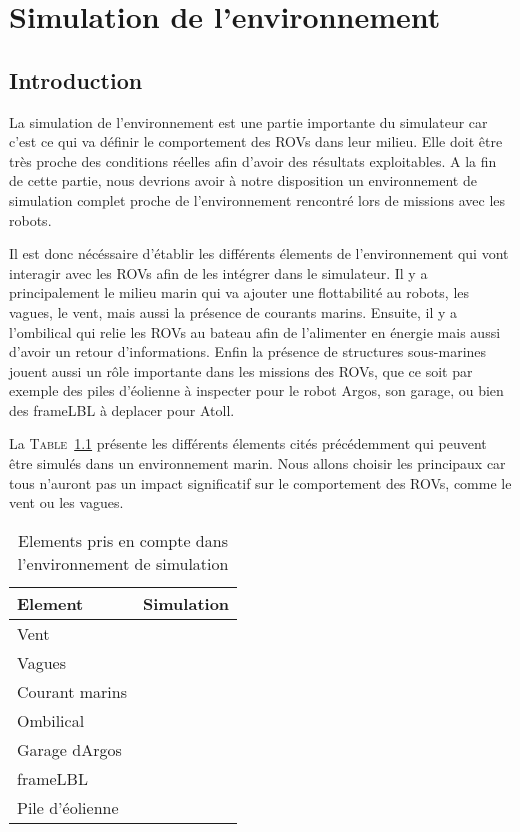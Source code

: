 \chapter{Simulation de l'environnement}
	\label{chapitre:environnement}
	
	\section{Introduction}

		La simulation de l'environnement est une partie importante du simulateur car c'est ce qui va définir le comportement des \gls{ROV}s dans leur milieu. Elle doit être très proche des conditions réelles afin d'avoir des résultats exploitables. A la fin de cette partie, nous devrions avoir à notre disposition un environnement de simulation complet proche de l'environnement rencontré lors de missions avec les robots.

		Il est donc nécéssaire d'établir les différents élements de l'environnement qui vont interagir avec les \gls{ROV}s afin de les intégrer dans le simulateur. Il y a principalement le milieu marin qui va ajouter une flottabilité au robots, les vagues, le vent, mais aussi la présence de courants marins. Ensuite, il y a l'ombilical qui relie les \gls{ROV}s au bateau afin de l'alimenter en énergie mais aussi d'avoir un retour d'informations. Enfin la présence de structures sous-marines jouent aussi un rôle importante dans les missions des \gls{ROV}s, que ce soit par exemple des piles d'éolienne à inspecter pour le robot \gls{Argos}, son garage, ou bien des \gls{frameLBL} à deplacer pour \gls{Atoll}.

		La \textsc{Table}~\ref{table:elements} présente les différents élements cités précédemment qui peuvent être simulés dans un environnement marin. Nous allons choisir les principaux car tous n'auront pas un impact significatif sur le comportement des \gls{ROV}s, comme le vent ou les vagues. 

		\begin{table}[ht]
			\centering
			\begin{tabular}{|l|c|}
				\hline
				Element & Simulation \\
				\hline
				Vent & \xmark\\
				\hline
				Vagues & \xmark\\
				\hline
				Courant marins & \cmark \\
				\hline
				Ombilical & \cmark \\
				\hline
				Garage d\gls{Argos} & \cmark \\
				\hline
				\gls{frameLBL} & \cmark \\
				\hline
				Pile d'éolienne & \cmark \\
				\hline
			\end{tabular}
			\caption{Elements pris en compte dans l'environnement de simulation}
			\label{table:elements}
		\end{table}


